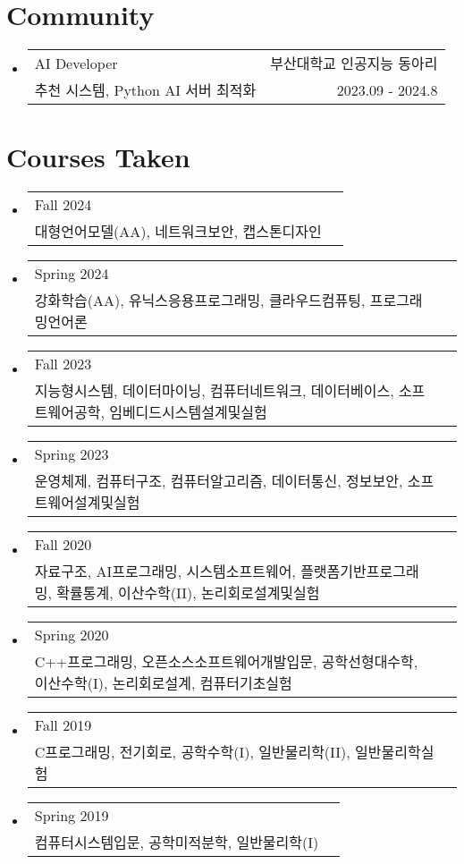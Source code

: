 \documentclass[letterpaper,11pt]{article}
\makeatletter
\newcommand{\resumeSkills}[2]{
  \item
    \begin{tabular*}{0.97\textwidth}[t]{l@{\extracolsep{\fill}}r}
      #1 \\ 
      {\small#2}
    \end{tabular*}\vspace{-5pt}
}
\newcommand{\resumeCommunity}[5]{
  \vspace{-1pt}\item
    \begin{tabular*}{0.97\textwidth}[t]{l@{\extracolsep{\fill}}r}
      {#1} & #2 \\
      {\small#3} {\small #4 \vspace{-2pt}} & {\small #5} \\
    \end{tabular*}\vspace{-5pt}
}
\newcommand{\resumeSubHeadingListStart}{\begin{itemize}[leftmargin=*]}
\newcommand{\resumeSubHeadingListEnd}{\end{itemize}}
\makeatother
\begin{document}
\section{Community}
  \resumeSubHeadingListStart
    \resumeCommunity{AI Developer}{부산대학교 인공지능 동아리}
      {추천 시스템, Python AI 서버 최적화}{}{2023.09 - 2024.8}
  \resumeSubHeadingListEnd

\section{Courses Taken}
  \resumeSubHeadingListStart
    \resumeSkills{{Fall 2024}}{대형언어모델(AA), 네트워크보안, 캡스톤디자인}
    \resumeSkills{{Spring 2024}}{강화학습(AA), 유닉스응용프로그래밍, 클라우드컴퓨팅, 프로그래밍언어론}
    \resumeSkills{{Fall 2023}}{지능형시스템, 데이터마이닝, 컴퓨터네트워크, 데이터베이스, 소프트웨어공학, 임베디드시스템설계및실험}
    \resumeSkills{{Spring 2023}}{운영체제, 컴퓨터구조, 컴퓨터알고리즘, 데이터통신, 정보보안, 소프트웨어설계및실험}
    \resumeSkills{{Fall 2020}}{자료구조, AI프로그래밍, 시스템소프트웨어, 플랫폼기반프로그래밍, 확률통계, 이산수학(II), 논리회로설계및실험}
    \resumeSkills{{Spring 2020}}{C++프로그래밍, 오픈소스소프트웨어개발입문, 공학선형대수학, 이산수학(I),  논리회로설계, 컴퓨터기초실험}
    \resumeSkills{{Fall 2019}}{C프로그래밍, 전기회로, 공학수학(I), 일반물리학(II), 일반물리학실험}
    \resumeSkills{{Spring 2019}}{컴퓨터시스템입문, 공학미적분학, 일반물리학(I)}
  \resumeSubHeadingListEnd
  



\end{document}
